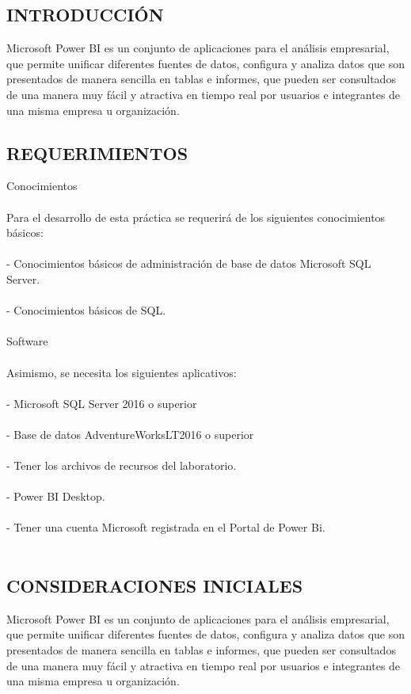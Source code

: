\documentclass[12pt,letterpaper]{article}
\begin{document}
\subsection*{INTRODUCCIÓN} 
Microsoft Power BI es un conjunto de aplicaciones para el análisis empresarial, que permite unificar diferentes fuentes de datos, configura y analiza datos que son presentados de manera sencilla en tablas e informes, que pueden ser consultados de una manera muy fácil y atractiva en tiempo real por usuarios e integrantes de una misma empresa u organización.

\subsection*{REQUERIMIENTOS}
Conocimientos \\\\
Para el desarrollo de esta práctica se requerirá de los siguientes conocimientos básicos: 
\\\\
- Conocimientos básicos de administración de base de datos Microsoft SQL Server. 
\\\\
- Conocimientos básicos de SQL.
\\\\
Software \\\\
Asimismo, se necesita los siguientes aplicativos: 
\\\\
- Microsoft SQL Server 2016 o superior 
\\\\
- Base de datos AdventureWorksLT2016 o superior
\\\\
- Tener los archivos de recursos del laboratorio. 
\\\\
- Power BI Desktop. 
\\\\
- Tener una cuenta Microsoft registrada en el Portal de Power Bi. 
\\\\
\subsection*{CONSIDERACIONES INICIALES}
Microsoft Power BI es un conjunto de aplicaciones para el análisis empresarial, que permite unificar diferentes fuentes de datos, configura y analiza datos que son presentados de manera sencilla en tablas e informes, que pueden ser consultados de una manera muy fácil y atractiva en tiempo real por usuarios e integrantes de una misma empresa u organización.
\end{document}
